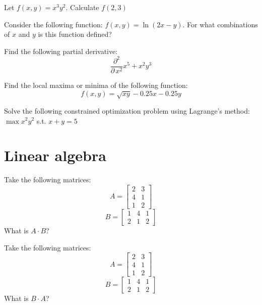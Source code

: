 \documentclass[10pt]{article}
\newenvironment{problem}[2][Problem]{\begin{trivlist}
\item[\hskip \labelsep {\bfseries #1}\hskip \labelsep {\bfseries #2.}]}{\end{trivlist}}
\begin{document}
\begin{problem}{3.8}
Let $f(x,y)=x^3y^2$. Calculate $f(2,3)$
\end{problem}

\begin{problem}{3.9}
Consider the following function: $f(x,y)=\ln(2x-y)$. For what combinations of $x$ and $y$ is this function defined?
\end{problem}

\begin{problem}{3.10}
Find the following partial derivative:
$$\frac{\partial^2}{\partial \, x^2} x^5+x^2y^3$$
\end{problem}

\begin{problem}{3.11}
Find the local maxima or minima of the following function:
$$f(x,y)=\sqrt{xy}-0.25x-0.25y$$
\end{problem}

\begin{problem}{3.12}
Solve the following constrained optimization problem using Lagrange's method:
$\max x^2y^2$ s.t. $x+y=5$
\end{problem}

\section{Linear algebra}

\begin{problem}{4.1}
Take the following matrices:
$$A=\begin{bmatrix} 2 & 3\\ 4 & 1 \\ 1 & 2\end{bmatrix}$$
$$B=\begin{bmatrix} 1 & 4 & 1\\2 & 1 & 2\end{bmatrix}$$
What is $A \cdot B$?
\end{problem}

\begin{problem}{4.2}
Take the following matrices:
$$A=\begin{bmatrix} 2 & 3\\ 4 & 1 \\ 1 & 2\end{bmatrix}$$
$$B=\begin{bmatrix} 1 & 4 & 1\\2 & 1 & 2\end{bmatrix}$$
What is $B \cdot A$?
\end{problem}
\end{document}
